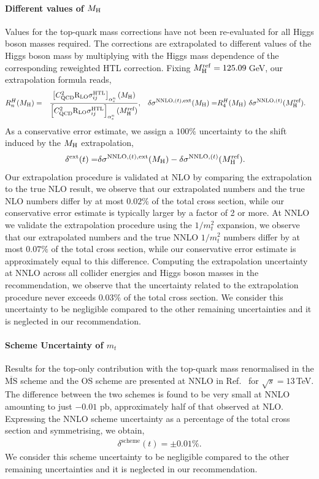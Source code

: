 \paragraph{Different values of $M_\mathrm{H}$}
Values for the top-quark mass corrections have not been re-evaluated for all Higgs boson masses required.
The corrections are extrapolated to different values of the Higgs boson mass by multiplying with the Higgs mass dependence of the corresponding reweighted HTL correction.
Fixing $M_\mathrm{H}^\mathrm{ref}=125.09$\,GeV, our extrapolation formula reads,
\begin{align}
&R^H_n(M_\mathrm{H}) = & \frac{\left[C_\mathrm{QCD}^2 \mathrm{R}_\mathrm{LO} \sigma_{ij}^\mathrm{HTL}\right]_{\alpha_s^n}(M_\mathrm{H})}{\left[C_\mathrm{QCD}^2 \mathrm{R}_\mathrm{LO} \sigma_{ij}^\mathrm{HTL}\right]_{\alpha_s^n}(M_\mathrm{H}^\text{ref})},&
&\delta \sigma^{\mathrm{NNLO}, (t), \text{ext}}(M_\mathrm{H}) = & R^H_4(M_\mathrm{H})\  \delta \sigma^{\mathrm{NNLO}, (t)}(M_\mathrm{H}^\text{ref}).&
\end{align}
As a conservative error estimate, we assign a $100\%$ uncertainty to the shift induced by the $M_\mathrm{H}$ extrapolation,
\begin{align}
\delta^\text{ext}(t) = & \delta \sigma^{\mathrm{NNLO}, (t), \text{ext}}(M_\mathrm{H}) - \delta \sigma^{\mathrm{NNLO}, (t)}(M_\mathrm{H}^\text{ref}).
\end{align}
Our extrapolation procedure is validated at NLO by comparing the extrapolation to the true NLO result, we observe that our extrapolated numbers and the true NLO numbers differ by at most $0.02\%$ of the total cross section, while our conservative error estimate is typically larger by a factor of 2 or more.
At NNLO we validate the extrapolation procedure using the $1/m_t^2$ expansion, we observe that our extrapolated numbers and the true NNLO $1/m_t^2$ numbers differ by at most $0.07\%$ of the total cross section, while our conservative error estimate is approximately equal to this difference.
Computing the extrapolation uncertainty at NNLO across all collider energies and Higgs boson masses in the recommendation, we observe that the uncertainty related to the extrapolation procedure never exceeds $ 0.03\%$ of the total cross section.
We consider this uncertainty to be negligible compared to the other remaining uncertainties and it is neglected in our recommendation.

\paragraph{Scheme Uncertainty of $m_t$} 
Results for the top-only contribution with the top-quark mass renormalised in the $\overline{\mathrm{MS}}$ scheme and the OS scheme are presented at NNLO in Ref.~\cite{Czakon:2024ywb} for $\sqrt{s}=13$\,TeV.
The difference between the two schemes is found to be very small at NNLO amounting to just $-0.01$ pb, approximately half of that observed at NLO.
Expressing the NNLO scheme uncertainty as a percentage of the total cross section and symmetrising, we obtain,
\begin{align}
\delta^\mathrm{scheme}(t) = \pm 0.01\%.
\end{align}
We consider this scheme uncertainty to be negligible compared to the other remaining uncertainties and it is neglected in our recommendation. 

